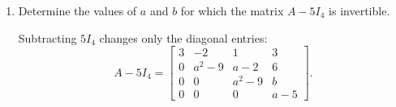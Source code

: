 \begin{enumerate}[label=\alph*)]
\begin{answer}
    \textbf{Case 4: $a=-2$.}

    Substitution gives
    $$
    \left[
    \begin{array}{cccc|c}
    8&-2&1&3&b\\
    0&0&-4&6&1\\
    0&0&0&b&2\\
    0&0&0&-2&2b
    \end{array}
    \right].
    $$

    The last two equations are
    $$
    \begin{cases}
    bx_4=2,\\
    -2x_4=2b.
    \end{cases}
    $$

    From the second equation,
    $$
    x_4=-b.
    $$

    Substitution into the first gives
    $$
    -b^2=2.
    $$

    Equivalently,
    $$
    b^2=-2.
    $$

    Since $b\in\mathbb{R}$, this is impossible.

    Thus the system is inconsistent for every real value of $b$.

    In this case,
    $$
    r(A)=3<4=r([A\mid B]).
    $$

    \textbf{Conclusion}

    $$
    \boxed{
    \begin{array}{ll}
    a\notin\{-2,0,2\}:&
    \text{SCD, for every }b,\\
    a=0,\ b=0:&
    \text{SCI, degree }1,\\
    a=0,\ b\neq0:&
    \text{SI},\\
    a\in\{-2,2\}:&
    \text{SI, for every }b.
    \end{array}
    }
    $$

    {\color{red}
    \textbf{Important:} To discuss a system, we must determine the ranks of the coefficient
    and augmented matrices. Computing the general solution is not required.}
\end{answer}

\item Determine the values of $a$
and $b$ for which the matrix
$A-5I_4$ is invertible.

\begin{answer}
    Subtracting $5I_4$ changes only the diagonal entries:
    $$
    A-5I_4=
    \begin{bmatrix}
    3&-2&1&3\\
    0&a^2-9&a-2&6\\
    0&0&a^2-9&b\\
    0&0&0&a-5
    \end{bmatrix}.
    $$


\end{answer}
\end{enumerate}
